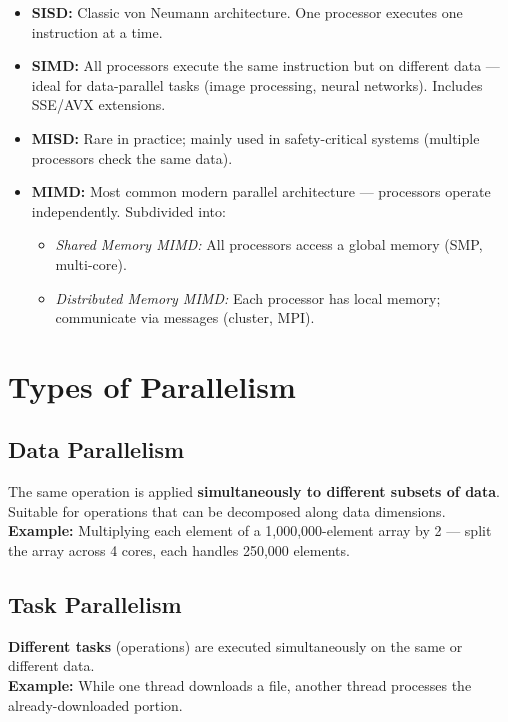 \documentclass[11pt,a4paper]{article}
\begin{document}
\begin{itemize}[leftmargin=*, itemsep=4pt]
  \item \textbf{SISD:} Classic von Neumann architecture. One processor executes one instruction at a time.
  \item \textbf{SIMD:} All processors execute the same instruction but on different data --- ideal for data-parallel tasks (image processing, neural networks). Includes SSE/AVX extensions.
  \item \textbf{MISD:} Rare in practice; mainly used in safety-critical systems (multiple processors check the same data).
  \item \textbf{MIMD:} Most common modern parallel architecture --- processors operate independently. Subdivided into:
  \begin{itemize}
    \item \textit{Shared Memory MIMD:} All processors access a global memory (SMP, multi-core).
    \item \textit{Distributed Memory MIMD:} Each processor has local memory; communicate via messages (cluster, MPI).
  \end{itemize}
\end{itemize}

\section{Types of Parallelism}

\subsection{Data Parallelism}
\begin{definitionbox}
The same operation is applied \textbf{simultaneously to different subsets of data}. Suitable for operations that can be decomposed along data dimensions.\\[4pt]
\textbf{Example:} Multiplying each element of a 1,000,000-element array by 2 --- split the array across 4 cores, each handles 250,000 elements.
\end{definitionbox}

\subsection{Task Parallelism}
\begin{definitionbox}
\textbf{Different tasks} (operations) are executed simultaneously on the same or different data.\\[4pt]
\textbf{Example:} While one thread downloads a file, another thread processes the already-downloaded portion.
\end{definitionbox}
\end{document}
